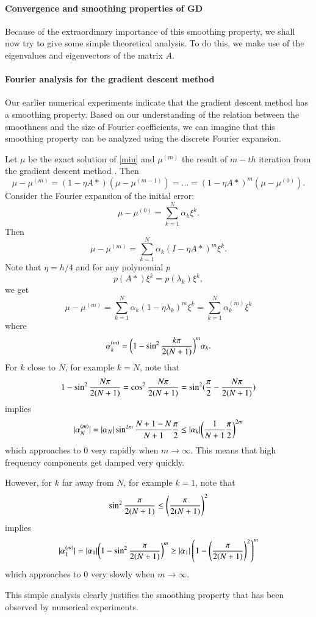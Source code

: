 \paragraph{Convergence and smoothing properties of GD}
Because of the extraordinary importance of this smoothing property, we
shall now try to give some simple theoretical analysis.  To do this,
we make use of the eigenvalues and eigenvectors of the matrix $A$.
\paragraph{Fourier analysis for the gradient descent method}
Our earlier numerical experiments indicate that the gradient descent
method has a smoothing property.  Based on our understanding of the
relation between the smoothness and the size of Fourier coefficients,
we can imagine that this smoothing property can be analyzed using the
discrete Fourier expansion.

Let $\mu$ be the exact solution of \eqref{min} and $\mu^{(m)}$ the result of
$m-th$ iteration from the gradient descent method .  Then
$$
\mu-\mu^{(m)}=(1-\eta A\ast)(\mu-\mu^{(m-1)})=\ldots=(1-\eta A\ast)^m(\mu-\mu^{(0)}).
$$
Consider the Fourier expansion of the initial error:
$$
        \mu-\mu^{(0)}=\sum_{k=1}^N\alpha_k\xi^k.
$$
Then 
$$
        \mu-\mu^{(m)}=\sum_{k=1}^N\alpha_k(I-\eta A\ast)^m\xi^k.
$$
Note that $\eta=h/4$ and for any polynomial $p$
$$
p(A\ast)\xi^k=p(\lambda_k)\xi^k,
$$
we get
$$
        \mu-\mu^{(m)}=\sum_{k=1}^N\alpha_k(1-\eta\lambda_k)^m\xi^k
        =\sum_{k=1}^N\alpha_k^{(m)}\xi^k
$$
where 
$$
\alpha_k^{(m)}=\bigg(1-\sin^2{{k\pi}\over {2(N+1)}}\bigg)^m\alpha_k.
$$
For $k$ close to $N$, for example $k=N$,
note that 
$$
1-\sin^2{{N\pi}\over {2(N+1)}}=\cos^2{{N\pi}\over {2(N+1)}}
=\sin^2({\pi\over2}-{{N\pi}\over {2(N+1)}})
$$
implies
$$
|\alpha_N^{(m)}|=|\alpha_N|\sin^{2m}{{N+1-N}\over{N+1}}{\pi\over 2}
\le |\alpha_k|\bigg({{1}\over{N+1}}{\pi\over 2}\bigg)^{2m}
$$
which approaches to $0$ very rapidly when
$m\rightarrow\infty$. This means that high frequency components get
damped very quickly. 

However, for $k$ far away from $N$, for example $k=1$, note that
$$
\sin^2{{\pi}\over {2(N+1)}}\le \left({{\pi}\over {2(N+1)}}\right)^2
$$
implies
$$
|\alpha_1^{(m)}|= |\alpha_1| \bigg(1-\sin^2{{\pi}\over {2(N+1)}}\bigg)^m\ge  |\alpha_1|  \left(1-\left({{\pi}\over {2(N+1)}}\right)^2\right)^m
$$
which approaches to $0$ very slowly when
$m\rightarrow\infty$. 

This simple analysis clearly justifies the smoothing property that has
been observed by numerical experiments.

